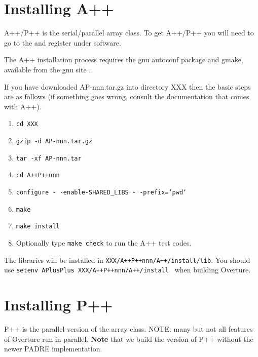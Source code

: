 \documentclass{article}
\begin{document}
\clearpage
\section{Installing A++}

A++/P++ is the serial/parallel array class.
To get A++/P++ you will need to go to the 
and register under software.

The A++ installation process requires the gnu autoconf package and gmake, available from the
gnu site .

If you have downloaded AP-nnn.tar.gz into directory XXX then the basic steps 
are as follows (if something goes wrong, consult the documentation that comes with A++). 
\begin{enumerate}
    \item {\tt cd XXX}
    \item {\tt gzip -d AP-nnn.tar.gz}
    \item {\tt tar -xf AP-nnn.tar}
    \item {\tt cd A++P++nnn}
    \item {\tt configure -\,-enable-SHARED\_LIBS -\,-prefix=`pwd`}
    \item {\tt make} 
    \item {\tt make install}
    \item Optionally type {\tt make check} to run the A++ test codes.
\end{enumerate}
The libraries will be installed in {\tt XXX/A++P++nnn/A++/install/lib}.
You should use {\tt setenv APlusPlus XXX/A++P++nnn/A++/install } when building Overture.

\clearpage
\section{Installing P++}

P++ is the parallel version of the array class. NOTE: many but not all features of Overture run in parallel. 
{\bf Note} that we build the version of P++ without the newer PADRE implementation. 
\end{document}
